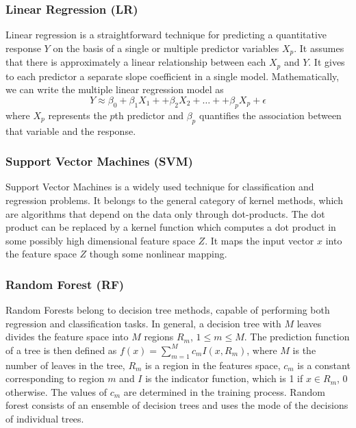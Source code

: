 \subsubsection{\textbf{Linear Regression (LR)}}
Linear regression is a straightforward technique for predicting a quantitative response $Y$ on the basis of a single or multiple predictor variables $X_p$. It assumes that there is approximately a linear relationship between each $X_p$ and $Y$. It gives to each predictor a separate slope coefficient in a single model. Mathematically, we can write the multiple linear regression model as
\begin{equation}
Y \approx \beta_0 + \beta_1 X_1 + + \beta_2 X_2 + \ldots + + \beta_p X_p + \epsilon
\end{equation}
where $X_p$ represents the $p$th predictor and $\beta_p$ quantifies the association between that variable and the response.

\subsubsection{\textbf{Support Vector Machines (SVM)}}
Support Vector Machines is a widely used technique for classification and regression problems. It belongs to the general category of kernel methods, which are algorithms that depend on the data only through dot-products. The dot product can be replaced by a kernel function which computes a dot product in some possibly high dimensional feature space $Z$. It maps the input vector $x$ into the feature space $Z$ though some nonlinear mapping. 

\subsubsection{\textbf{Random Forest (RF)}} 
Random Forests belong to decision tree methods, capable of performing both regression and classification tasks. In general, a decision tree with $M$ leaves divides the feature space into $M$ regions $R_m$, $1 \leq m \leq M$. The prediction function of a tree is then defined as $f(x) = \sum_{m=1}^{M} c_m I(x, R_m)$, where $M$ is the number of leaves in the tree, $R_m$ is a region in the features space, $c_m$ is a constant corresponding to region $m$ and $I$ is the indicator function, which is 1 if $x \in R_m$, 0 otherwise. The values of $c_m$ are determined in the training process. Random forest consists of an ensemble of decision trees and uses the mode of the decisions of individual trees.


